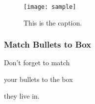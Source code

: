 \begin{frame}
	\begin{figure}
		\centering
        \texttt{[image: sample]}
        \label{fig:OOA-MDG-ARK4}
    \caption{ 	This is the caption. }
	\end{figure}
\end{frame}

\begin{frame}\frametitle{Match Bullets to Box}

{
  \begin{grassgreenitemize}
  \item Don't forget to match \item your bullets to the box \item they live in. 
  \end{grassgreenitemize}
}

\end{frame}

